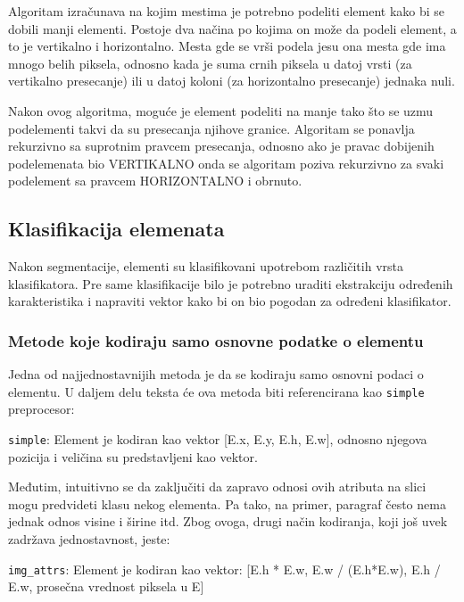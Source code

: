 \documentclass[]{amsart}
\begin{document}
Algoritam izračunava na kojim mestima je potrebno podeliti element kako bi se dobili manji elementi. Postoje dva načina po kojima on može da podeli element, a to je
vertikalno i horizontalno. Mesta gde se vrši podela jesu ona mesta gde ima mnogo belih piksela, odnosno kada je suma crnih piksela u datoj vrsti (za vertikalno presecanje)
ili u datoj koloni (za horizontalno presecanje) jednaka nuli.

Nakon ovog algoritma, moguće je element podeliti na manje tako što se uzmu podelementi takvi da su presecanja njihove granice. Algoritam se ponavlja rekurzivno
sa suprotnim pravcem presecanja, odnosno ako je pravac dobijenih podelemenata bio VERTIKALNO onda se algoritam poziva rekurzivno za svaki podelement sa pravcem HORIZONTALNO
i obrnuto. 

\subsection{Klasifikacija elemenata}
\label{sec:org4f634b4}

Nakon segmentacije, elementi su klasifikovani upotrebom različitih vrsta klasifikatora. Pre same klasifikacije bilo je potrebno uraditi ekstrakciju
određenih karakteristika i napraviti vektor kako bi on bio pogodan za određeni klasifikator.




\subsubsection{Metode koje kodiraju samo osnovne podatke o elementu}
\label{sec:orgd93cd26}

Jedna od najjednostavnijih metoda je da se kodiraju samo osnovni podaci o elementu. U daljem delu teksta će ova metoda biti referencirana kao \texttt{simple} preprocesor:

\texttt{simple}: Element je kodiran kao vektor [E.x, E.y, E.h, E.w], odnosno njegova pozicija i veličina su predstavljeni kao vektor.


Međutim, intuitivno se da zaključiti da zapravo odnosi ovih atributa na slici mogu predvideti klasu nekog elementa. Pa tako, na primer, paragraf
često nema jednak odnos visine i širine itd. Zbog ovoga, drugi način kodiranja, koji još uvek zadržava jednostavnost, jeste:

\texttt{img\_attrs}: Element je kodiran kao vektor:  [E.h * E.w, E.w / (E.h*E.w), E.h / E.w, prosečna vrednost piksela u E]

\newpage 
\end{document}
